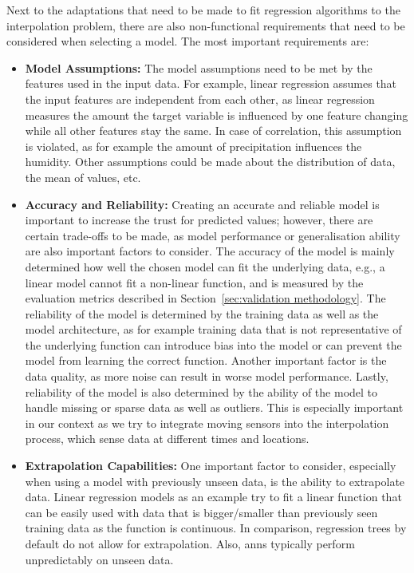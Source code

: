 Next to the adaptations that need to be made to fit regression algorithms to the interpolation problem, there are also non-functional requirements that need to be considered when selecting a model. The most important requirements are:

\begin{itemize}
    \item \textbf{Model Assumptions:} The model assumptions need to be met by the features used in the input data. For example, linear regression assumes that the input features are independent from each other, as linear regression measures the amount the target variable is influenced by one feature changing while all other features stay the same. In case of correlation, this assumption is violated, as for example the amount of precipitation influences the humidity. Other assumptions could be made about the distribution of data, the mean of values, etc.
    \item \textbf{Accuracy and Reliability:} Creating an accurate and reliable model is important to increase the trust for predicted values; however, there are certain trade-offs to be made, as model performance or generalisation ability are also important factors to consider.
    The accuracy of the model is mainly determined how well the chosen model can fit the underlying data, e.g., a linear model cannot fit a non-linear function, and is measured by the evaluation metrics described in Section~\ref{sec:validation methodology}.
    The reliability of the model is determined by the training data as well as the model architecture, as for example training data that is not representative of the underlying function can introduce bias into the model or can prevent the model from learning the correct function. Another important factor is the data quality, as more noise can result in worse model performance. Lastly, reliability of the model is also determined by the ability of the model to handle missing or sparse data as well as outliers. This is especially important in our context as we try to integrate moving sensors into the interpolation process, which sense data at different times and locations.
    \item \textbf{Extrapolation Capabilities:} One important factor to consider, especially when using a model with previously unseen data, is the ability to extrapolate data. Linear regression models as an example try to fit a linear function that can be easily used with data that is bigger/smaller than previously seen training data as the function is continuous. In comparison, regression trees by default do not allow for extrapolation. Also, \gls{ann}s typically perform unpredictably on unseen data.

\end{itemize}
